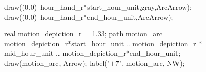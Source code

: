 \documentclass[../gatm.tex]{subfiles}
\begin{document}
\begin{figure}[h]
\begin{center}
\begin{minipage}[c]{0.35\textwidth}
\begin{center}
\begin{minipage}[b]{\textwidth}
\begin{asy}[width=0.7\textwidth]
						draw((0,0)--hour_hand_r*start_hour_unit,gray,ArcArrow);
						draw((0,0)--hour_hand_r*end_hour_unit,ArcArrow);
						
						real motion_depiction_r = 1.33;
						path motion_arc = motion_depiction_r*start_hour_unit .. motion_depiction_r * mid_hour_unit .. motion_depiction_r*end_hour_unit;
						draw(motion_arc, Arrow);
						label("$+7$", motion_arc, NW);
					\end{asy}
				\end{minipage}
			\end{center}
			\vspace*{-2\baselineskip}
			\begin{center}
				\begin{minipage}[t]{\textwidth}
					\label{fig:clock_arithm}
				\end{minipage}
			\end{center}
		\end{minipage}
	\end{center}
\end{figure}
\end{document}
